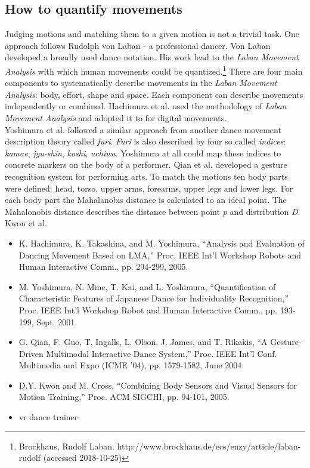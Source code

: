 \subsection{How to quantify movements}
Judging motions and matching them to a given motion is not a trivial task. One approach follows Rudolph von Laban - a professional dancer. Von Laban developed a broadly used dance notation. His work lead to the \textit{Laban Movement Analysis} with which human movements could be quantized.\footnote{Brockhaus, Rudolf Laban. http://www.brockhaus.de/ecs/enzy/article/laban-rudolf (accessed 2018-10-25)} There are four main components to systematically describe movements in the \textit{Laban Movement Analysis}: body, effort, shape and space. Each component can describe movements independently or combined. Hachimura et al. \cite{Hachimura2005} used the methodology  of \textit{Laban Movement Analysis} and adopted it to for digital movements.\\
Yoshimura et al. \cite{Yoshimura2005} followed a similar approach from another dance movement description theory called \textit{furi}. \textit{Furi} is also described by four so called \textit{indices}: \textit{kamae}, \textit{jyu-shin}, \textit{koshi}, \textit{uchiwa}. Yoshimura at all could map these indices to concrete markers on the body of a performer.
Qian et al. \cite{GangQian2005} developed a gesture recognition system for performing arts. To match the motions ten body parts were defined: head, torso, upper arms, forearms, upper legs and lower legs. For each body part the Mahalanobis distance is calculated to an ideal point. The Mahalonobis distance describes the distance between point \textit{p} and distribution \textit{D}. Kwon et al. \cite{Kwon2005} \todo 
\begin{itemize}
	\item K. Hachimura, K. Takashina, and M. Yoshimura, “Analysis and
	Evaluation of Dancing Movement Based on LMA,” Proc. IEEE Int’l
	Workshop Robots and Human Interactive Comm., pp. 294-299, 2005.
	\item M. Yoshimura, N. Mine, T. Kai, and L. Yoshimura, “Quantification	of Characteristic Features of Japanese Dance for Individuality Recognition,” Proc. IEEE Int’l Workshop Robot and Human Interactive Comm., pp. 193-199, Sept. 2001.
	\item G. Qian, F. Guo, T. Ingalls, L. Olson, J. James, and T. Rikakis, “A	Gesture-Driven Multimodal Interactive Dance System,” Proc. IEEE	Int’l Conf. Multimedia and Expo (ICME ’04), pp. 1579-1582, June	2004.
	\item D.Y. Kwon and M. Cross, “Combining Body Sensors and Visual
	Sensors for Motion Training,” Proc. ACM SIGCHI, pp. 94-101,	2005.
	\item vr dance trainer
\end{itemize}

